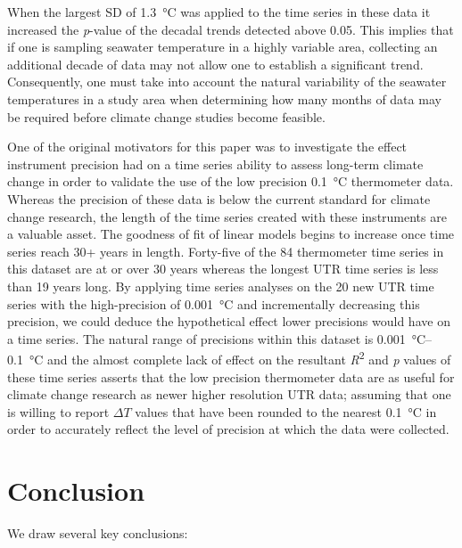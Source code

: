 \documentclass{ametsoc}
\begin{document}
When the largest SD of \SI{1.3}{\degreeCelsius} was applied to the time series in these data it increased the \emph{p}-value of the decadal trends detected above 0.05. This implies that if one is sampling seawater temperature in a highly variable area, collecting an additional decade of data may not allow one to establish a significant trend. Consequently, one must take into account the natural variability of the seawater temperatures in a study area when determining how many months of data may be required before climate change studies become feasible.

One of the original motivators for this paper was to investigate the effect instrument precision had on a time series ability to assess long-term climate change in order to validate the use of the low precision \SI{0.1}{\degreeCelsius} thermometer data. Whereas the precision of these data is below the current standard for climate change research, the length of the time series created with these instruments are a valuable asset. The goodness of fit of linear models begins to increase once time series reach 30+ years in length. Forty-five of the 84 thermometer time series in this dataset are at or over 30 years whereas the longest UTR time series is less than 19 years long. By applying time series analyses on the 20 new UTR time series with the high-precision of \SI{0.001}{\degreeCelsius} and incrementally decreasing this precision, we could deduce the hypothetical effect lower precisions would have on a time series. The natural range of precisions within this dataset is \SIrange{0.001}{0.1}{\degreeCelsius} and the almost complete lack of effect on the resultant \emph{R}\textsuperscript{2} and \emph{p} values of these time series asserts that the low precision thermometer data are as useful for climate change research as newer higher resolution UTR data; assuming that one is willing to report $\Delta T$ values that have been rounded to the nearest \SI{0.1}{\degreeCelsius} in order to accurately reflect the level of precision at which the data were collected.

\section{Conclusion}
We draw several key conclusions:
\end{document}
